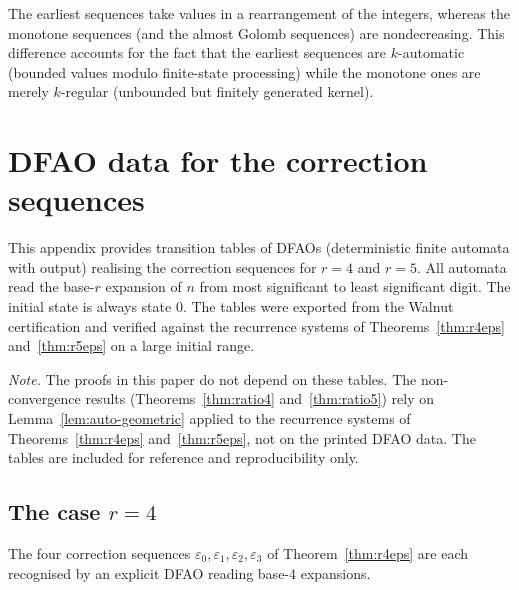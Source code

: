 \documentclass[12pt]{article}
\theoremstyle{definition}
\theoremstyle{remark}
\begin{document}
The earliest sequences take values in a rearrangement of the integers,
whereas the monotone sequences (and the almost Golomb sequences) are nondecreasing.
This difference accounts for the fact that the earliest sequences are $k$-automatic
(bounded values modulo finite-state processing) while the monotone ones are merely
$k$-regular (unbounded but finitely generated kernel).


\section{DFAO data for the correction sequences}\label{app:dfao}

This appendix provides transition tables of DFAOs
(deterministic finite automata with output) realising the correction sequences
for $r=4$ and $r=5$.
All automata read the base-$r$ expansion of $n$ from most significant to least
significant digit. The initial state is always state $0$. The tables
were exported from the Walnut certification and verified against the
recurrence systems of Theorems~\ref{thm:r4eps} and~\ref{thm:r5eps}
on a large initial range.

\emph{Note.}
The proofs in this paper do not depend on these tables.
The non-convergence results (Theorems~\ref{thm:ratio4}
and~\ref{thm:ratio5}) rely on
Lemma~\ref{lem:auto-geometric} applied to the recurrence systems
of Theorems~\ref{thm:r4eps} and~\ref{thm:r5eps},
not on the printed DFAO data.
The tables are included for reference and reproducibility only.

\subsection*{The case $r=4$}

The four correction sequences $\varepsilon_0,\varepsilon_1,\varepsilon_2,\varepsilon_3$
of Theorem~\ref{thm:r4eps} are each recognised by an explicit DFAO reading
base-$4$ expansions.
\end{document}
